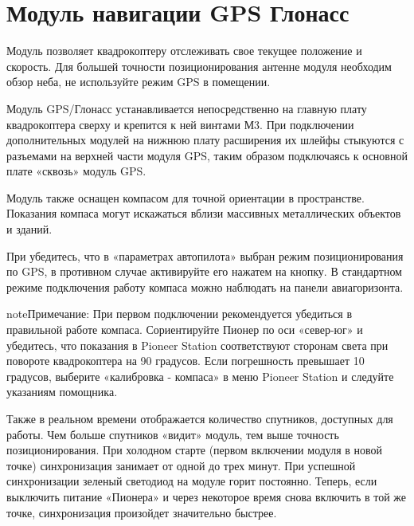\documentclass[a4paper,10pt,russian]{sphinxmanual}
\begin{document}
\section{Модуль навигации GPS Глонасс}
\label{\detokenize{module/gps:gps}}\label{\detokenize{module/gps::doc}}

Модуль позволяет квадрокоптеру отслеживать свое текущее положение и скорость. Для большей точности позиционирования антенне модуля необходим обзор неба, не используйте режим GPS в помещении.

Модуль GPS/Глонасс устанавливается непосредственно на главную плату квадрокоптера сверху и крепится к ней винтами М3. При подключении дополнительных модулей на нижнюю плату расширения их шлейфы стыкуются с разъемами на верхней части модуля GPS, таким образом подключаясь к основной плате «сквозь» модуль GPS.

Модуль также оснащен компасом для точной ориентации в пространстве. Показания компаса могут искажаться вблизи массивных металлических объектов и зданий.

При   убедитесь, что в «параметрах автопилота» выбран режим позиционирования по GPS, в противном случае активируйте его нажатем на кнопку. В стандартном режиме подключения работу компаса можно наблюдать на панели авиагоризонта.

\begin{sphinxadmonition}{note}{Примечание:}
При первом подключении рекомендуется убедиться в правильной работе компаса. Сориентируйте Пионер по оси «север-юг» и убедитесь, что показания в Pioneer Station соответствуют сторонам света при повороте квадрокоптера на 90 градусов. Если погрешность превышает 10 градусов, выберите «калибровка - компаса» в меню Pioneer Station и следуйте указаниям помощника.
\end{sphinxadmonition}

Также в реальном времени отображается количество спутников, доступных для работы. Чем больше спутников «видит» модуль, тем выше точность позиционирования. При холодном старте (первом включении модуля в новой точке) синхронизация занимает от одной до трех минут. При успешной синхронизации зеленый светодиод на модуле горит постоянно. Теперь, если выключить питание «Пионера» и через некоторое время снова включить в той же точке, синхронизация произойдет значительно быстрее.
\end{document}
